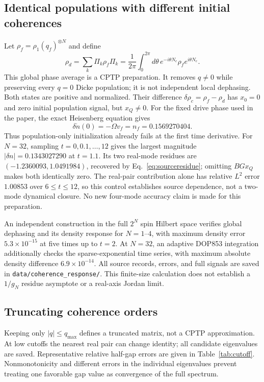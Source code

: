 \documentclass[aps,pra,10pt,onecolumn,superscriptaddress,amsmath,amssymb]{revtex4-2}
\begin{document}
\subsection{Identical populations with different initial coherences}
Let $\rho_f=\rho_1(q_f)^{\otimes N}$ and define
\begin{equation}
 \rho_d=\sum_k\Pi_k\rho_f\Pi_k
 =\frac{1}{2\pi}\int_0^{2\pi}d\theta\,
 e^{-i\theta N_e}\rho_f e^{i\theta N_e}.
\end{equation}
This global phase average is a CPTP preparation. It removes $q\ne0$ while preserving every $q=0$ Dicke population; it is not independent local dephasing. Both states are positive and normalized. Their difference $\delta\rho_c=\rho_f-\rho_d$ has $x_0=0$ and zero initial population signal, but $x_Q\ne0$. For the fixed drive phase used in the paper, the exact Heisenberg equation gives
\begin{equation}
 \delta\dot n(0)=-\Omega v_f=n_f=0.1569270404.
\end{equation}
Thus population-only initialization already fails at the first time derivative. For $N=32$, sampling $t=0,0.1,\ldots,12$ gives the largest magnitude $|\delta n|=0.1343027290$ at $t=1.1$. Its two real-mode residues are $(-1.2360093,1.0491984)$, recovered by Eq.~\eqref{eq:sourceresidue}; omitting $BGx_Q$ makes both identically zero. The real-pair contribution alone has relative $L^2$ error $1.00853$ over $6\le t\le12$, so this control establishes source dependence, not a two-mode dynamical closure. No new four-mode accuracy claim is made for this preparation.

An independent construction in the full $2^N$ spin Hilbert space verifies global dephasing and its density response for $N=1$--$4$, with maximum density error $5.3\times10^{-15}$ at five times up to $t=2$. At $N=32$, an adaptive DOP853 integration additionally checks the sparse-exponential time series, with maximum absolute density difference $6.9\times10^{-14}$. All source records, errors, and full signals are saved in \texttt{data/coherence\_response/}. This finite-size calculation does not establish a $1/g_N$ residue asymptote or a real-axis Jordan limit.

\subsection{Truncating coherence orders}
Keeping only $|q|\le q_{\max}$ defines a truncated matrix, not a CPTP approximation. At low cutoffs the nearest real pair can change identity; all candidate eigenvalues are saved. Representative relative half-gap errors are given in Table~\ref{tab:cutoff}. Nonmonotonicity and different errors in the individual eigenvalues prevent treating one favorable gap value as convergence of the full spectrum.
\end{document}
